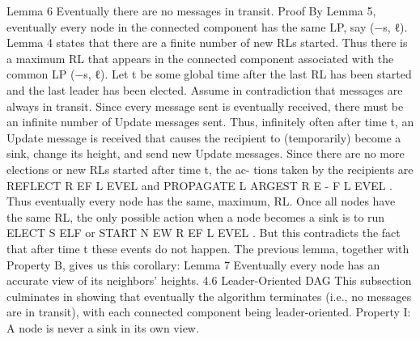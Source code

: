 Lemma 6 Eventually there are no messages in transit. Proof By Lemma 5, eventually every node in the connected component has the same LP, say (−s, ℓ). Lemma 4 states that there are a finite number of new RLs started. Thus there is a maximum RL that appears in the connected component associated with the common LP (−s, ℓ). Let t be some global time after the last RL has been started and the last leader has been elected. Assume in contradiction that messages are always in transit. Since every message sent is eventually received, there must be an infinite number of Update messages sent. Thus, infinitely often after time t, an Update message is received that causes the recipient to (temporarily) become a sink, change its height, and send new Update messages. Since there are no more elections or new RLs started after time t, the ac- tions taken by the recipients are REFLECT R EF L EVEL and PROPAGATE L ARGEST R E - F L EVEL . Thus eventually every node has the same, maximum, RL. Once all nodes have the same RL, the only possible action when a node becomes a sink is to run ELECT S ELF or START N EW R EF L EVEL . But this contradicts the fact that after time t these events do not happen. The previous lemma, together with Property B, gives us this corollary: Lemma 7 Eventually every node has an accurate view of its neighbors’ heights. 4.6 Leader-Oriented DAG This subsection culminates in showing that eventually the algorithm terminates (i.e., no messages are in transit), with each connected component being leader-oriented. Property I: A node is never a sink in its own view.
